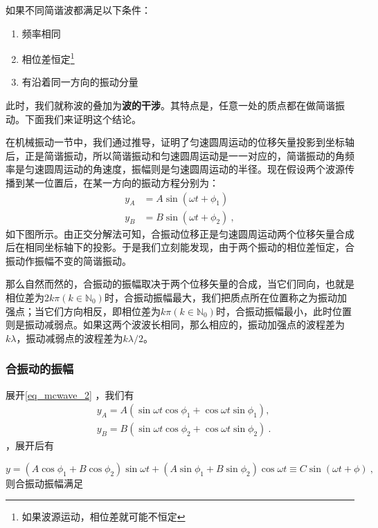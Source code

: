 如果不同简谐波都满足以下条件：
\begin{enumerate}
\item 频率相同
\item 相位差恒定\footnote{如果波源运动，相位差就可能不恒定}
\item 有沿着同一方向的振动分量
\end{enumerate}
此时，我们就称波的叠加为\textbf{波的干涉}。其特点是，任意一处的质点都在做简谐振动。下面我们来证明这个结论。



在机械振动一节中，我们通过推导，证明了匀速圆周运动的位移矢量投影到坐标轴后，正是简谐振动，所以简谐振动和匀速圆周运动是一一对应的，简谐振动的角频率是匀速圆周运动的角速度，振幅则是匀速圆周运动的半径。现在假设两个波源传播到某一位置后，在某一方向的振动方程分别为：
\begin{equation}\label{eq_mcwave_2}
\begin{aligned}
y_A&=A\sin(\omega t+\phi_1)\\
y_B&=B\sin (\omega t+\phi_2)~,
\end{aligned}
\end{equation}
如下图所示。由正交分解法可知，合振动位移正是匀速圆周运动两个位移矢量合成后在相同坐标轴下的投影。于是我们立刻能发现，由于两个振动的相位差恒定，合振动作振幅不变的简谐振动。

那么自然而然的，合振动的振幅取决于两个位移矢量的合成，当它们同向，也就是相位差为$2k\pi(k\in \mathbb{N}_0)$时，合振动振幅最大，我们把质点所在位置称之为振动加强点；当它们方向相反，即相位差为$k\pi(k\in \mathbb{N}_0)$时，合振动振幅最小，此时位置则是振动减弱点。如果这两个波波长相同，那么相应的，振动加强点的波程差为$k\lambda $，振动减弱点的波程差为$k\lambda/2$。
\subsubsection{合振动的振幅}
展开\autoref{eq_mcwave_2} ，我们有
\begin{equation}
\begin{aligned}
& y_A=A\left(\sin \omega t \cos \phi_1+\cos \omega t \sin \phi_1\right), \\
& y_B=B\left(\sin \omega t \cos \phi_2+\cos \omega t \sin \phi_2\right)~.
\end{aligned}
\end{equation}
，展开后有

\begin{equation}
y=\left(A \cos \phi_1+B \cos \phi_2\right) \sin \omega t+\left(A \sin \phi_1+B \sin \phi_2\right) \cos \omega t\equiv C\sin (\omega t+\phi)~,
\end{equation}
则合振动振幅满足

